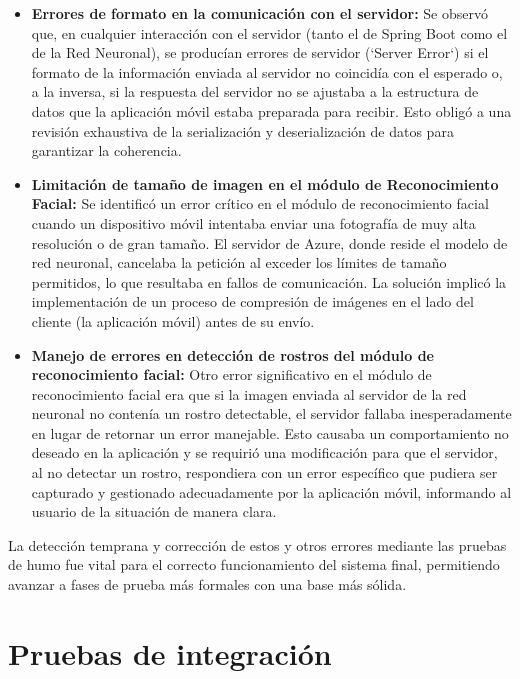 \begin{itemize}
	\item \textbf{Errores de formato en la comunicación con el servidor:} Se observó que, en cualquier interacción con el servidor (tanto el de Spring Boot como el de la Red Neuronal), se producían errores de servidor (`Server Error`) si el formato de la información enviada al servidor no coincidía con el esperado o, a la inversa, si la respuesta del servidor no se ajustaba a la estructura de datos que la aplicación móvil estaba preparada para recibir. Esto obligó a una revisión exhaustiva de la serialización y deserialización de datos para garantizar la coherencia.
	
	\item \textbf{Limitación de tamaño de imagen en el módulo de Reconocimiento Facial:} Se identificó un error crítico en el módulo de reconocimiento facial cuando un dispositivo móvil intentaba enviar una fotografía de muy alta resolución o de gran tamaño. El servidor de Azure, donde reside el modelo de red neuronal, cancelaba la petición al exceder los límites de tamaño permitidos, lo que resultaba en fallos de comunicación. La solución implicó la implementación de un proceso de compresión de imágenes en el lado del cliente (la aplicación móvil) antes de su envío.
	
	\item \textbf{Manejo de errores en detección de rostros del módulo de reconocimiento facial:} Otro error significativo en el módulo de reconocimiento facial era que si la imagen enviada al servidor de la red neuronal no contenía un rostro detectable, el servidor fallaba inesperadamente en lugar de retornar un error manejable. Esto causaba un comportamiento no deseado en la aplicación y se requirió una modificación para que el servidor, al no detectar un rostro, respondiera con un error específico que pudiera ser capturado y gestionado adecuadamente por la aplicación móvil, informando al usuario de la situación de manera clara.
\end{itemize}

La detección temprana y corrección de estos y otros errores mediante las pruebas de humo fue vital para el correcto funcionamiento del sistema final, permitiendo avanzar a fases de prueba más formales con una base más sólida.

\section{Pruebas de integración}

